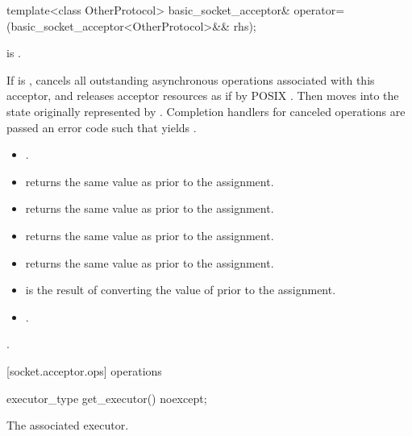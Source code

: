 \begin{itemdecl}
template<class OtherProtocol>
  basic_socket_acceptor& operator=(basic_socket_acceptor<OtherProtocol>&& rhs);
\end{itemdecl}

\begin{itemdescr}
\pnum
\constraints {} is .

\pnum
\effects If  is , cancels all outstanding asynchronous operations associated with this acceptor, and releases acceptor resources as if by POSIX . Then moves into  the state originally represented by . Completion handlers for canceled operations are passed an error code  such that  yields .

\pnum
\postconditions
\begin{itemize}
\item
{}.
\item
{} returns the same value as  prior to the assignment.
\item
{} returns the same value as  prior to the assignment.
\item
{} returns the same value as  prior to the assignment.
\item
{} returns the same value as  prior to the assignment.
\item
{} is the result of converting the value of  prior to the assignment.
\item
{}.
\end{itemize}

\pnum
\returns {}.
\end{itemdescr}



[socket.acceptor.ops]{ operations}

\begin{itemdecl}
executor_type get_executor() noexcept;
\end{itemdecl}

\begin{itemdescr}
\pnum
\returns The associated executor.
\end{itemdescr}

